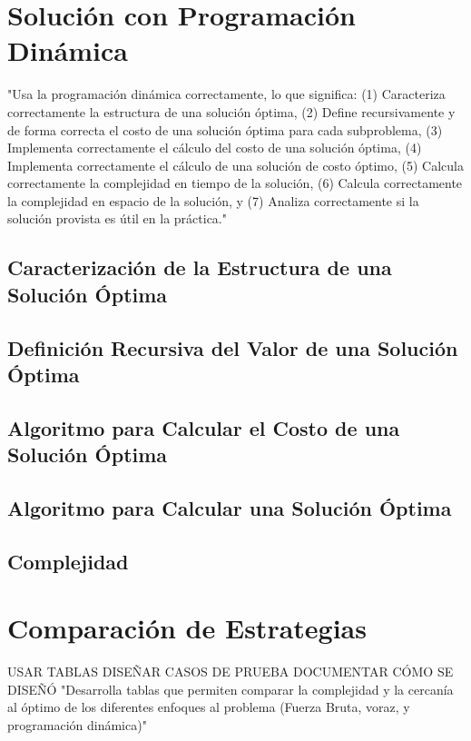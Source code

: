 \documentclass[letterpaper,10pt]{article}
\begin{document}
\section{Solución con Programación Dinámica}
\label{sec:programacion_dinamica}
"Usa la programación dinámica correctamente, lo que significa: (1) Caracteriza correctamente la estructura de una solución óptima, (2) Define recursivamente y de forma correcta el costo de una solución óptima para cada subproblema, (3) Implementa correctamente el cálculo del costo de una solución óptima, (4) Implementa correctamente el cálculo de una solución de costo óptimo, (5) Calcula correctamente la complejidad en tiempo de la solución, (6) Calcula correctamente la complejidad en espacio de la solución, y (7) Analiza correctamente si la solución provista es útil en la práctica."
\subsection{Caracterización de la Estructura de una Solución Óptima}
\label{subsec:caracterizacion_solucion_optima}
\subsection{Definición Recursiva del Valor de una Solución Óptima}
\label{subsec:definicion_solucion_optima}
\subsection{Algoritmo para Calcular el Costo de una Solución Óptima}
\label{subsec:algoritmo_costo_solucion_optima}
\subsection{Algoritmo para Calcular una Solución Óptima}
\label{subsec:algoritmo_solucion_optima}
\subsection{Complejidad}
\label{subsec:complejidad_programacion_dinamica}

\section{Comparación de Estrategias}
\label{sec:comparacion_estrategias}
USAR TABLAS DISEÑAR CASOS DE PRUEBA DOCUMENTAR CÓMO SE DISEÑÓ
"Desarrolla tablas que permiten comparar la complejidad y la cercanía al óptimo de los diferentes enfoques al problema (Fuerza Bruta, voraz, y programación dinámica)"
\end{document}
